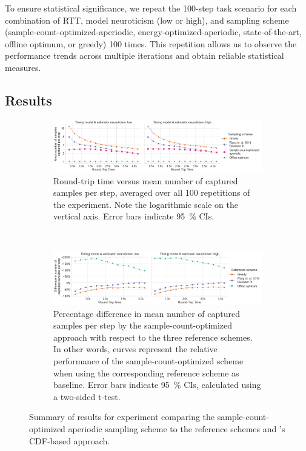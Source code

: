 To ensure statistical significance, we repeat the \num{100}-step task scenario for each combination of \gls{RTT}, model neuroticism (low or high), and sampling scheme (sample-count-optimized-aperiodic, energy-optimized-aperiodic, state-of-the-art, offline optimum, or greedy) \num{100} times.
This repetition allows us to observe the performance trends across multiple iterations and obtain reliable statistical measures.

\subsection{Results}

\begin{figure}
    \centering
    \begin{subfigure}[t]{\textwidth}
        \centering
        \includegraphics[width=\textwidth]{figs/new_model/sampling_optimization.png}
        \caption{%
            Round-trip time versus mean number of captured samples per step, averaged over all \num{100} repetitions of the experiment.
            Note the logarithmic scale on the vertical axis.
            Error bars indicate \SI{95}{\percent} \glspl{CI}.
        }
    \end{subfigure}\\
    \medskip
    \begin{subfigure}[t]{\textwidth}
        \centering
        \includegraphics[width=\textwidth]{figs/new_model/sampling_optimization_diff.png}
        \caption{%
            Percentage difference in mean number of captured samples per step by the sample-count-optimized approach with respect to the three reference schemes.
            In other words, curves represent the relative performance of the sample-count-optimized scheme when using the corresponding reference scheme as baseline.
            Error bars indicate \SI{95}{\percent} \glspl{CI}, calculated using a two-sided t-test.
        }
    \end{subfigure}
    \caption{%
        Summary of results for experiment comparing the sample-count-optimized aperiodic sampling scheme to the reference schemes and \textcite{wang2019towards}'s \gls{CDF}-based approach.
    }\label{fig:optimization:samples}
\end{figure}

